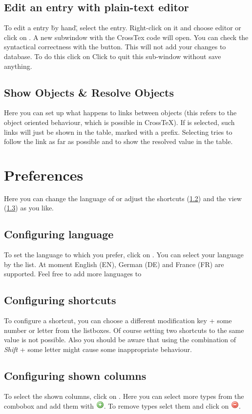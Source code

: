 \documentclass[a4paper,10pt]{scrartcl}
\begin{document}
\subsection{Edit an entry with plain-text editor} 
To edit a entry \"by hand\", select the entry. Right-click on it and choose
\editplain editor or click on \clickpath{\edit}{\editplain}. A
new subwindow with the CrossTex code will open. You can check the syntactical
correctness with the \checksyntax button. This will not add your changes to
database. To do this click on \checksave Click to \cancel quit this sub-window
without save anything.
\subsection{Show Objects \& Resolve Objects}
Here you can set up what happens to links between objects (this refers to the
object oriented behaviour, which is possible in CrossTeX).
If \showobjects is selected, such links will just be shown in the table, marked
with a \textrangle\textrangle prefix. Selecting \resolveobjects tries to follow
the link as far as possible and to show the resolved value in the table.
\section{Preferences}
Here you can change the language of \crossrefx or adjust the shortcuts
(\ref{shortcuts}) and the view (\ref{view}) as you like.
\subsection{Configuring language}
\label{language} 
To set the language to which you prefer, click on
\clickpath{\extras}{\clickpath {\preferences}{\generalpreferences}}. You can
select your language by the list. At moment English (EN), German (DE) and France
(FR) are supported. Feel free to add more languages to \crossrefx
\subsection{Configuring shortcuts}\label{shortcuts}
To configure a shortcut, you can choose a different modification key + some
number or letter from the listboxes. Of course setting two shortcuts to the same
value is not possible.
Also you should be aware that using the combination of \textit{Shift} + some
letter might cause some inappropriate behaviour.
\subsection{Configuring shown columns}\label{view}
To select the shown columns, click on
\clickpath{\extras}{\clickpath{\preferences}{\adjustview}}. Here you can select
more types from the combobox and add them with
\includegraphics{../../images/add.png}. To remove types selct them and click on
\includegraphics{../../images/delete.png}.
\end{document}
